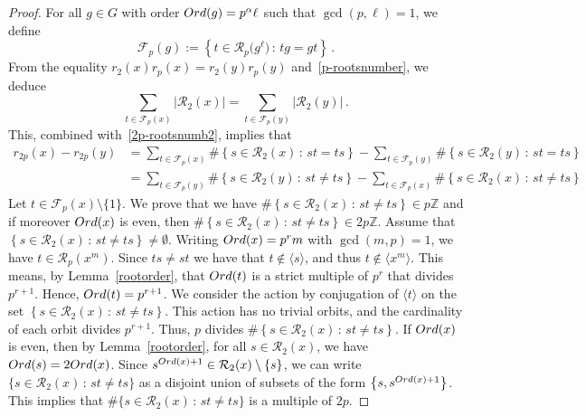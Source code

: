\documentclass[10pt,a4paper]{amsart}
\newcommand{\Ord}{{\rm Ord}}
\newcommand{\Z}{\mathbb Z}
\begin{document}
\begin{proof}
    For all $g\in G$ with order $\Ord(g)=p^\alpha \ell$ such that $\gcd(p,\ell)=1$, we define \[\mathcal{F}_p(g):=\left\{ t\in \mathcal{R}_p\bigl(g^\ell\bigr)\, \colon\,  tg=gt\right\}\, .\]
    From the equality $r_2(x)r_p(x)=r_2(y)r_p(y)$ and~\eqref{p-rootsnumber}, we deduce 
    \[\sum_{t\in \mathcal{F}_p(x)}\left| \mathcal{R}_2(x)\right|=\sum_{t\in\mathcal{F}_p(y)}\left|\mathcal{R}_2(y)\right|\, .\]
    This, combined with~\eqref{2p-rootsnumb2}, implies that
    \begin{align*}
        r_{2p}(x)-r_{2p}(y)&=\sum_{t\in \mathcal{F}_p(x)}\#\left\{s\in \mathcal{R}_2(x)\, \colon\,  st=ts\right\}-\sum_{t\in \mathcal{F}_p(y)}\#\left\{s\in \mathcal{R}_2(y)\, \colon\,  st=ts\right\}\\
        &=\sum_{t\in \mathcal{F}_p(y)}\#\left\{s\in \mathcal{R}_2(y)\, \colon\,  st\ne ts\right\}-\sum_{t\in \mathcal{F}_p(x)}\#\left\{s\in \mathcal{R}_2(x)\, \colon\,  st\ne ts\right\}
    \end{align*}
    Let $t\in \mathcal{F}_p(x)\setminus\{1\}$. We prove that we have $\#\left\{s\in \mathcal{R}_2(x)\, \colon\,  st\ne ts\right\}\in p\Z$ and if moreover $\Ord(x)$ is even, then $\#\left\{s\in \mathcal{R}_2(x)\, \colon\,  st\ne ts\right\}\in 2p\Z$.
    Assume that $\left\{s\in \mathcal{R}_2(x)\, \colon\,  st\ne ts\right\}\ne \emptyset$. Writing $\Ord(x)=p^rm$ with $\gcd(m,p)=1$, we have $t\in \mathcal{R}_{p}(x^m)$. Since $ts\ne st$ we have that $t\notin \langle s\rangle$, and thus $t\notin\langle x^m \rangle$. This means, by Lemma~\ref{rootorder}, that $\Ord(t)$ is a strict multiple of $p^{r}$ that divides $p^{r+1}$. Hence, $\Ord(t)=p^{r+1}$. We consider the action by conjugation of $\langle t\rangle$ on the set $\left\{s\in \mathcal{R}_2(x)\, \colon\,  st\ne ts\right\}$. This action has no trivial orbits, and the cardinality of each orbit divides $p^{r+1}$. Thus, $p$ divides $\#\left\{s\in \mathcal{R}_2(x)\, \colon\,  st\ne ts\right\}$. If $\Ord(x)$ is even, then by Lemma~\ref{rootorder}, for all $s\in \mathcal{R}_2(x)$, we have $\Ord(s)=2\Ord(x)$. Since $s^{\Ord(x)+1}\in \mathcal{R}_2(x)\setminus\{s\}$, we can write $\{s\in \mathcal{R}_2(x)\, \colon\,  st\ne ts\}$ as a disjoint union of subsets of the form $\left\{s,s^{\Ord(x)+1}\right\}$. This implies that $\#\{s\in \mathcal{R}_2(x)\, \colon\,  st\ne ts\}$ is a multiple of $2p$.
    

\end{proof}
\end{document}
